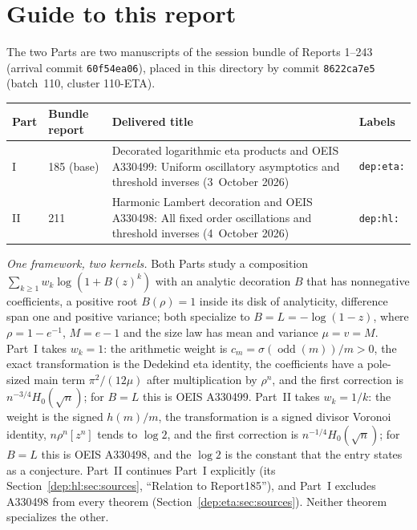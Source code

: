 \documentclass[11pt]{article}
\theoremstyle{definition}\newtheorem{definition}[theorem]{Definition}
\theoremstyle{remark}\newtheorem{remark}[theorem]{Remark}
\newcommand{\odd}{\operatorname{odd}}
\begin{document}
\section*{Guide to this report}\label{dep:sec:guide}
The two Parts are two manuscripts of the session bundle of Reports 1--243
(arrival commit \texttt{60f54ea06}), placed in this directory by commit
\texttt{8622ca7e5} (batch~110, cluster 110-ETA).
\begin{center}
\small
\begin{tabular}{@{}l l >{\raggedright\arraybackslash}p{} l@{}}
\toprule
Part & Bundle report & Delivered title & Labels\\
\midrule
I & 185 (base) & Decorated logarithmic eta products and OEIS A330499: Uniform oscillatory asymptotics and threshold inverses (3~October 2026) & \texttt{dep:eta:}\\
II & 211 & Harmonic Lambert decoration and OEIS A330498: All fixed order oscillations and threshold inverses (4~October 2026) & \texttt{dep:hl:}\\
\bottomrule
\end{tabular}
\end{center}

\emph{One framework, two kernels.} Both Parts study a composition
$\sum_{k\ge1}w_k\log(1+B(z)^k)$ with an analytic decoration $B$ that has
nonnegative coefficients, a positive root $B(\rho)=1$ inside its disk of
analyticity, difference span one and positive variance; both specialize to
$B=L=-\log(1-z)$, where $\rho=1-e^{-1}$, $M=e-1$ and the size law has mean and
variance $\mu=v=M$. Part~I takes $w_k=1$: the arithmetic weight is
$c_m=\sigma(\odd(m))/m>0$, the exact transformation is the Dedekind eta
identity, the coefficients have a pole-sized main term $\pi^2/(12\mu)$ after
multiplication by $\rho^n$, and the first correction is
$n^{-3/4}H_0(\sqrt n)$; for $B=L$ this is OEIS A330499. Part~II takes
$w_k=1/k$: the weight is the signed $h(m)/m$, the transformation is a signed
divisor Voronoi identity, $n\rho^n[z^n]$ tends to $\log2$, and the first
correction is $n^{-1/4}H_0(\sqrt n)$; for $B=L$ this is OEIS A330498, and the
$\log2$ is the constant that the entry states as a conjecture. Part~II
continues Part~I explicitly (its Section~\ref{dep:hl:sec:sources}, ``Relation
to Report185''), and Part~I excludes A330498 from every theorem
(Section~\ref{dep:eta:sec:sources}). Neither theorem specializes the other.
\end{document}
